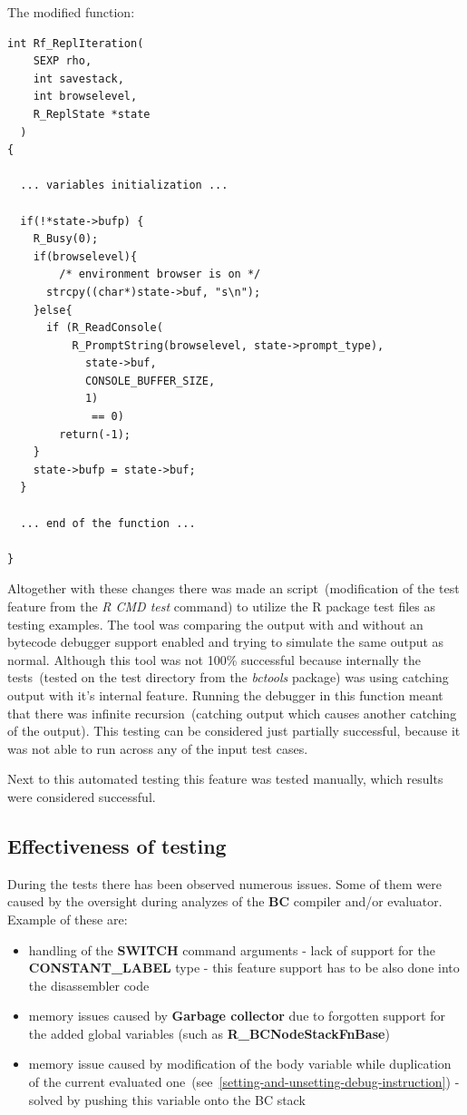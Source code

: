 \documentclass[thesis=M,english]{FITthesis}[2018/10/20]
\begin{document}
The modified function:
\begin{lstlisting}
int Rf_ReplIteration(
	SEXP rho, 
	int savestack, 
	int browselevel, 
	R_ReplState *state
  )
{

  ... variables initialization ...

  if(!*state->bufp) {
    R_Busy(0);
    if(browselevel){	
    	/* environment browser is on */
      strcpy((char*)state->buf, "s\n");
    }else{
      if (R_ReadConsole(
      	  R_PromptString(browselevel, state->prompt_type),
            state->buf, 
            CONSOLE_BUFFER_SIZE, 
            1)
             == 0)
        return(-1);
    }
    state->bufp = state->buf;
  }

  ... end of the function ...

}
\end{lstlisting}

Altogether with these changes there was made an script~(modification of the test feature from the \textit{R CMD test} command) to utilize the R package test files as testing examples. The tool was comparing the output with and without an bytecode debugger support enabled and trying to simulate the same output as normal. Although this tool was not 100\% successful because internally the tests~(tested on the test directory from the \textit{bctools} package) was using catching output with it's internal feature. Running the debugger in this function meant that there was infinite recursion~(catching output which causes another catching of the output). This testing can be considered just partially successful, because it was not able to run across any of the input test cases. 

Next to this automated testing this feature was tested manually, which results were considered successful.

\subsection{Effectiveness of testing}

During the tests there has been observed numerous issues. Some of them were caused by the oversight during analyzes of the \textbf{BC} compiler and/or evaluator. Example of these are:
\begin{itemize}
	\item handling of the \textbf{SWITCH} command arguments - lack of support for the \textbf{CONSTANT{\_}LABEL} type - this feature support has to be also done into the disassembler code
	\item memory issues caused by \textbf{Garbage collector} due to forgotten support for the added global variables (such as \textbf{R{\_}BCNodeStackFnBase})
	\item memory issue caused by modification of the body variable while duplication of the current evaluated one~(see~\ref{setting-and-unsetting-debug-instruction}) - solved by pushing this variable onto the BC stack
\end{itemize}
\end{document}

